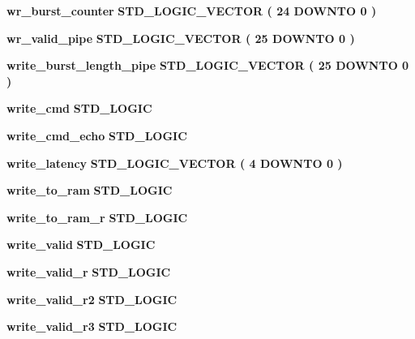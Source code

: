 \begin{DoxyCompactItemize}
\item 
{\bf wr\+\_\+burst\+\_\+counter} {\bfseries \textcolor{comment}{S\+T\+D\+\_\+\+L\+O\+G\+I\+C\+\_\+\+V\+E\+C\+T\+OR}\textcolor{vhdlchar}{ }\textcolor{vhdlchar}{(}\textcolor{vhdlchar}{ }\textcolor{vhdlchar}{ } \textcolor{vhdldigit}{24} \textcolor{vhdlchar}{ }\textcolor{keywordflow}{D\+O\+W\+N\+TO}\textcolor{vhdlchar}{ }\textcolor{vhdlchar}{ } \textcolor{vhdldigit}{0} \textcolor{vhdlchar}{ }\textcolor{vhdlchar}{)}\textcolor{vhdlchar}{ }} 
\item 
{\bf wr\+\_\+valid\+\_\+pipe} {\bfseries \textcolor{comment}{S\+T\+D\+\_\+\+L\+O\+G\+I\+C\+\_\+\+V\+E\+C\+T\+OR}\textcolor{vhdlchar}{ }\textcolor{vhdlchar}{(}\textcolor{vhdlchar}{ }\textcolor{vhdlchar}{ } \textcolor{vhdldigit}{25} \textcolor{vhdlchar}{ }\textcolor{keywordflow}{D\+O\+W\+N\+TO}\textcolor{vhdlchar}{ }\textcolor{vhdlchar}{ } \textcolor{vhdldigit}{0} \textcolor{vhdlchar}{ }\textcolor{vhdlchar}{)}\textcolor{vhdlchar}{ }} 
\item 
{\bf write\+\_\+burst\+\_\+length\+\_\+pipe} {\bfseries \textcolor{comment}{S\+T\+D\+\_\+\+L\+O\+G\+I\+C\+\_\+\+V\+E\+C\+T\+OR}\textcolor{vhdlchar}{ }\textcolor{vhdlchar}{(}\textcolor{vhdlchar}{ }\textcolor{vhdlchar}{ } \textcolor{vhdldigit}{25} \textcolor{vhdlchar}{ }\textcolor{keywordflow}{D\+O\+W\+N\+TO}\textcolor{vhdlchar}{ }\textcolor{vhdlchar}{ } \textcolor{vhdldigit}{0} \textcolor{vhdlchar}{ }\textcolor{vhdlchar}{)}\textcolor{vhdlchar}{ }} 
\item 
{\bf write\+\_\+cmd} {\bfseries \textcolor{comment}{S\+T\+D\+\_\+\+L\+O\+G\+IC}\textcolor{vhdlchar}{ }} 
\item 
{\bf write\+\_\+cmd\+\_\+echo} {\bfseries \textcolor{comment}{S\+T\+D\+\_\+\+L\+O\+G\+IC}\textcolor{vhdlchar}{ }} 
\item 
{\bf write\+\_\+latency} {\bfseries \textcolor{comment}{S\+T\+D\+\_\+\+L\+O\+G\+I\+C\+\_\+\+V\+E\+C\+T\+OR}\textcolor{vhdlchar}{ }\textcolor{vhdlchar}{(}\textcolor{vhdlchar}{ }\textcolor{vhdlchar}{ } \textcolor{vhdldigit}{4} \textcolor{vhdlchar}{ }\textcolor{keywordflow}{D\+O\+W\+N\+TO}\textcolor{vhdlchar}{ }\textcolor{vhdlchar}{ } \textcolor{vhdldigit}{0} \textcolor{vhdlchar}{ }\textcolor{vhdlchar}{)}\textcolor{vhdlchar}{ }} 
\item 
{\bf write\+\_\+to\+\_\+ram} {\bfseries \textcolor{comment}{S\+T\+D\+\_\+\+L\+O\+G\+IC}\textcolor{vhdlchar}{ }} 
\item 
{\bf write\+\_\+to\+\_\+ram\+\_\+r} {\bfseries \textcolor{comment}{S\+T\+D\+\_\+\+L\+O\+G\+IC}\textcolor{vhdlchar}{ }} 
\item 
{\bf write\+\_\+valid} {\bfseries \textcolor{comment}{S\+T\+D\+\_\+\+L\+O\+G\+IC}\textcolor{vhdlchar}{ }} 
\item 
{\bf write\+\_\+valid\+\_\+r} {\bfseries \textcolor{comment}{S\+T\+D\+\_\+\+L\+O\+G\+IC}\textcolor{vhdlchar}{ }} 
\item 
{\bf write\+\_\+valid\+\_\+r2} {\bfseries \textcolor{comment}{S\+T\+D\+\_\+\+L\+O\+G\+IC}\textcolor{vhdlchar}{ }} 
\item 
{\bf write\+\_\+valid\+\_\+r3} {\bfseries \textcolor{comment}{S\+T\+D\+\_\+\+L\+O\+G\+IC}\textcolor{vhdlchar}{ }} 
\end{DoxyCompactItemize}
